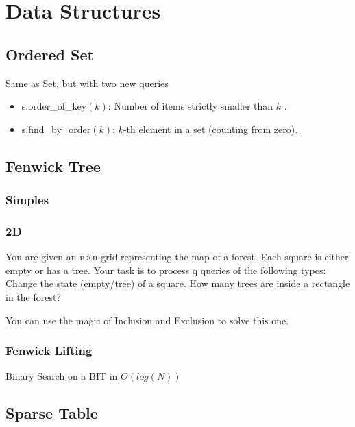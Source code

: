 \chapter{Data Structures}
    
    \section{Ordered Set}
    \tab Same as Set, but with two new queries
    \begin{itemize}
        \item s.order\_of\_key$(k)$: Number of items strictly smaller than $k$ .
        \item s.find\_by\_order$(k)$: $k$-th element in a set (counting from zero).
    \end{itemize}
    
    
    
    \bigskip
    \section{Fenwick Tree}
    \subsection{Simples}

    
    
    \subsection{2D}
    \tab You are given an n×n grid representing the map of a forest. Each square is either empty or has a tree. Your task is to process q queries of the following types:
    Change the state (empty/tree) of a square.
    How many trees are inside a rectangle in the forest?

    You can use the magic of Inclusion and Exclusion to solve this one.
    
    \subsection{Fenwick Lifting}
    \tab Binary Search on a BIT in $O(log(N))$
    
    
    \section{Sparse Table}
    
